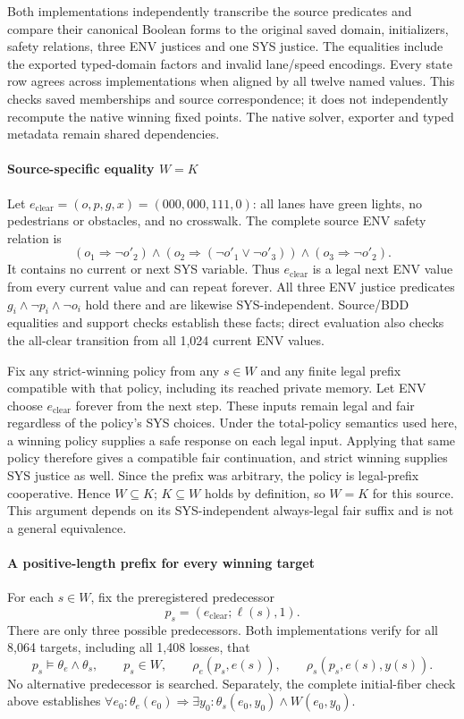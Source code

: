 Both implementations independently transcribe the source predicates and
compare their canonical Boolean forms to the original saved domain,
initializers, safety relations, three ENV justices and one SYS justice.
The equalities include the exported typed-domain factors and invalid
lane/speed encodings. Every state row agrees across implementations
when aligned by all twelve named values. This checks saved memberships
and source correspondence; it does not independently recompute the
native winning fixed points. The native solver, exporter and typed
metadata remain shared dependencies.

\paragraph{Source-specific equality $W=K$}
Let $e_{\mathrm{clear}}=(o,p,g,x)=(000,000,111,0)$: all lanes have
green lights, no pedestrians or obstacles, and no crosswalk. The complete
source ENV safety relation is
\[
 (o_1\Rightarrow\neg o'_2)\land
 (o_2\Rightarrow(\neg o'_1\lor\neg o'_3))\land
 (o_3\Rightarrow\neg o'_2).
\]
It contains no current or next SYS variable. Thus $e_{\mathrm{clear}}$
is a legal next ENV value from every current value and can repeat forever.
All three ENV justice predicates $g_i\land\neg p_i\land\neg o_i$
hold there and are likewise SYS-independent. Source/BDD equalities and
support checks establish these facts; direct evaluation also checks the
all-clear transition from all 1,024 current ENV values.

Fix any strict-winning policy from any $s\in W$ and any finite legal
prefix compatible with that policy, including its reached private memory.
Let ENV choose $e_{\mathrm{clear}}$ forever from the next step. These
inputs remain legal and fair regardless of the policy's SYS choices.
Under the total-policy semantics used here, a winning policy supplies a
safe response on each legal input. Applying that same policy therefore
gives a compatible fair continuation, and strict winning supplies SYS
justice as well. Since the prefix was arbitrary, the policy is
legal-prefix cooperative. Hence $W\subseteq K$; $K\subseteq W$ holds
by definition, so $W=K$ for this source. This argument depends on its
SYS-independent always-legal fair suffix and is not a general equivalence.

\paragraph{A positive-length prefix for every winning target}
For each $s\in W$, fix the preregistered predecessor
\[
 p_s=(e_{\mathrm{clear}};\ell(s),1).
\]
There are only three possible predecessors. Both implementations verify
for all 8,064 targets, including all 1,408 losses, that
\[
 p_s\models\theta_e\land\theta_s,\qquad p_s\in W,\qquad
 \rho_e(p_s,e(s)),\qquad \rho_s(p_s,e(s),y(s)).
\]
No alternative predecessor is searched. Separately, the complete
initial-fiber check above establishes
$\forall e_0:\theta_e(e_0)\Rightarrow
\exists y_0:\theta_s(e_0,y_0)\land W(e_0,y_0)$.

